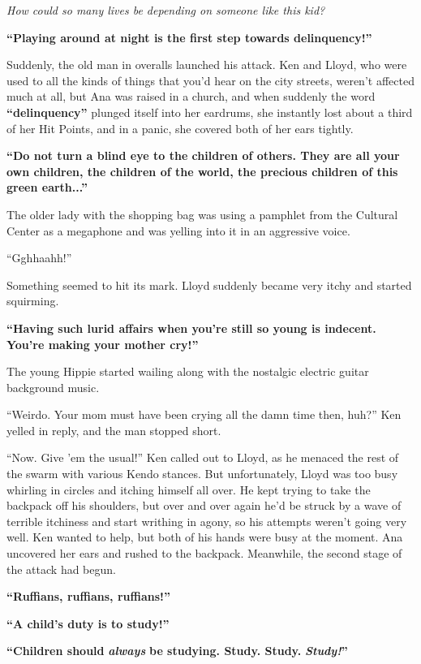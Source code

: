 \documentclass[
]{article}
\begin{document}
\emph{How could so many lives be depending on someone like this kid?}

\textbf{``Playing around at night is the first step towards
delinquency!''}

Suddenly, the old man in overalls launched his attack. Ken and Lloyd,
who were used to all the kinds of things that you'd hear on the city
streets, weren't affected much at all, but Ana was raised in a church,
and when suddenly the word \textbf{``delinquency''} plunged itself into
her eardrums, she instantly lost about a third of her Hit Points, and in
a panic, she covered both of her ears tightly.

\textbf{``Do not turn a blind eye to the children of others. They are
all your own children, the children of the world, the precious children
of this green earth...''}

The older lady with the shopping bag was using a pamphlet from the
Cultural Center as a megaphone and was yelling into it in an aggressive
voice.

``Gghhaahh!''

Something seemed to hit its mark. Lloyd suddenly became very itchy and
started squirming.

\textbf{``Having such lurid affairs when you're still so young is
indecent. You're making your mother cry!''}

The young Hippie started wailing along with the nostalgic electric
guitar background music.

``Weirdo. Your mom must have been crying all the damn time then, huh?''
Ken yelled in reply, and the man stopped short.

``Now. Give 'em the usual!'' Ken called out to Lloyd, as he menaced the
rest of the swarm with various Kendo stances. But unfortunately, Lloyd
was too busy whirling in circles and itching himself all over. He kept
trying to take the backpack off his shoulders, but over and over again
he'd be struck by a wave of terrible itchiness and start writhing in
agony, so his attempts weren't going very well. Ken wanted to help, but
both of his hands were busy at the moment. Ana uncovered her ears and
rushed to the backpack. Meanwhile, the second stage of the attack had
begun.

\textbf{``Ruffians, ruffians, ruffians!''}

\textbf{``A child's duty is to study!''}

\textbf{``Children should }\emph{\textbf{always}}\textbf{ be studying.
Study. Study. }\emph{\textbf{Study!}}\textbf{''}
\end{document}
